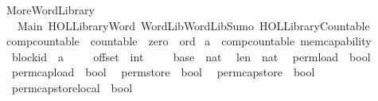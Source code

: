 %
\begin{isabellebody}%
%
%
\isadelimtheory
\isanewline
\isanewline
%
\endisadelimtheory
%
\isatagtheory
{}\isamarkupfalse%
\ More{\isacharunderscore}{\kern0pt}Word{\isacharunderscore}{\kern0pt}Library\isanewline
\ \ \ Main\ {\isachardoublequoteopen}HOL{\isacharminus}{\kern0pt}Library{\isachardot}{\kern0pt}Word{\isachardoublequoteclose}\ {\isachardoublequoteopen}Word{\isacharunderscore}{\kern0pt}Lib{\isachardot}{\kern0pt}Word{\isacharunderscore}{\kern0pt}Lib{\isacharunderscore}{\kern0pt}Sumo{\isachardoublequoteclose}\ {\isachardoublequoteopen}HOL{\isacharminus}{\kern0pt}Library{\isachardot}{\kern0pt}Countable{\isachardoublequoteclose}\isanewline
{}%
\endisatagtheory
{\isafoldtheory}%
%
\isadelimtheory
\isanewline
%
\endisadelimtheory
\isanewline
{}\isamarkupfalse%
\ comp{\isacharunderscore}{\kern0pt}countable\ {\isacharequal}{\kern0pt}\ countable\ {\isacharplus}{\kern0pt}\ zero\ {\isacharplus}{\kern0pt}\ ord\isanewline
\isanewline
{}\isamarkupfalse%
\ {\isacharparenleft}{\kern0pt}{\isacharprime}{\kern0pt}a\ {\isacharcolon}{\kern0pt}{\isacharcolon}{\kern0pt}\ comp{\isacharunderscore}{\kern0pt}countable{\isacharparenright}{\kern0pt}\ mem{\isacharunderscore}{\kern0pt}capability\ {\isacharequal}{\kern0pt}\isanewline
\ \ \isanewline
\ \ block{\isacharunderscore}{\kern0pt}id\ {\isacharcolon}{\kern0pt}{\isacharcolon}{\kern0pt}\ {\isachardoublequoteopen}{\isacharprime}{\kern0pt}a{\isachardoublequoteclose}\isanewline
\ \ \isanewline
\ \ offset\ {\isacharcolon}{\kern0pt}{\isacharcolon}{\kern0pt}\ int\isanewline
\ \ \isanewline
\ \ base\ {\isacharcolon}{\kern0pt}{\isacharcolon}{\kern0pt}\ nat\isanewline
\ \ len\ {\isacharcolon}{\kern0pt}{\isacharcolon}{\kern0pt}\ nat\isanewline
\ \ perm{\isacharunderscore}{\kern0pt}load\ {\isacharcolon}{\kern0pt}{\isacharcolon}{\kern0pt}\ bool\isanewline
\ \ perm{\isacharunderscore}{\kern0pt}cap{\isacharunderscore}{\kern0pt}load\ {\isacharcolon}{\kern0pt}{\isacharcolon}{\kern0pt}\ bool\isanewline
\ \ perm{\isacharunderscore}{\kern0pt}store\ {\isacharcolon}{\kern0pt}{\isacharcolon}{\kern0pt}\ bool\isanewline
\ \ perm{\isacharunderscore}{\kern0pt}cap{\isacharunderscore}{\kern0pt}store\ {\isacharcolon}{\kern0pt}{\isacharcolon}{\kern0pt}\ bool\isanewline
\ \ perm{\isacharunderscore}{\kern0pt}cap{\isacharunderscore}{\kern0pt}store{\isacharunderscore}{\kern0pt}local\ {\isacharcolon}{\kern0pt}{\isacharcolon}{\kern0pt}\ bool\isanewline

\end{isabellebody}
